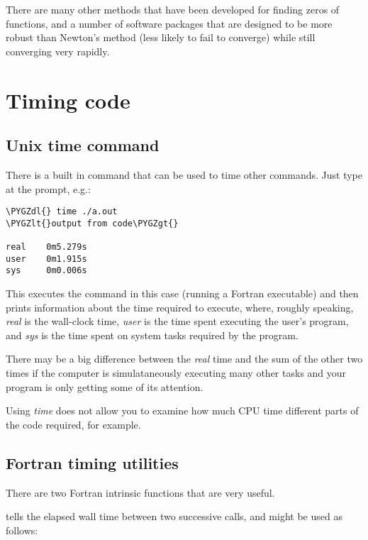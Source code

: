 \documentclass[letterpaper,10pt,english]{sphinxmanual}
\def\PYGZlt{\char`\<}
\def\PYGZgt{\char`\>}
\def\PYGZdl{\char`\$}
\begin{document}
There are many other methods that have been developed for finding zeros of
functions, and a number of software packages that are designed to be more
robust than Newton's method (less likely to fail to converge) while still
converging very rapidly.


\section{Timing code}
\label{timing:timing}\label{timing::doc}\label{timing:timing-code}

\subsection{Unix time command}
\label{timing:unix-time-command}\label{timing:timing-unix}
There is a built in command  that can be used to time other commands.
Just type  at the prompt, e.g.:

\begin{Verbatim}[commandchars=\\\{\}]
\PYGZdl{} time ./a.out
\PYGZlt{}output from code\PYGZgt{}

real    0m5.279s
user    0m1.915s
sys     0m0.006s
\end{Verbatim}

This executes the command  in this case (running a Fortran
executable) and then prints information
about the time required to execute, where, roughly speaking,
\emph{real} is the wall-clock time, \emph{user} is the time spent executing the
user's program, and \emph{sys} is the time spent on system tasks required by the
program.

There may be a big difference between the \emph{real} time and the sum of the
other two times if the computer is simulataneously executing many other
tasks and your program is only getting some of its attention.

Using \emph{time} does not allow you to examine how much CPU time different parts
of the code required, for example.


\subsection{Fortran timing utilities}
\label{timing:timing-fortran}\label{timing:fortran-timing-utilities}
There are two Fortran intrinsic functions that are very useful.

 tells the elapsed wall time between two successive calls, and
might be used as follows:
\end{document}
